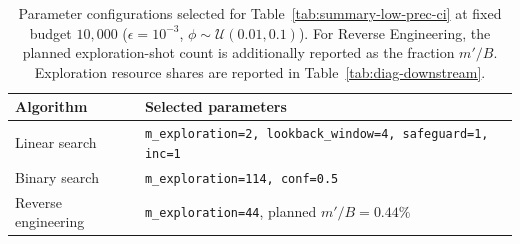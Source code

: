 \begin{table}[ht]
\centering
\caption{Parameter configurations selected for Table~\ref{tab:summary-low-prec-ci} at fixed budget $10{,}000$ ($\epsilon=10^{-3}$, $\phi\sim\mathcal{U}(0.01,0.1)$). For Reverse Engineering, the planned exploration-shot count is additionally reported as the fraction $m'/B$. Exploration resource shares are reported in Table~\ref{tab:diag-downstream}.}
\label{tab:opt-param-first-tab}
\begin{tabular}{ll}
\toprule
Algorithm
& Selected parameters \\
\midrule
Linear search
& \texttt{m\_exploration=2, lookback\_window=4, safeguard=1, inc=1} \\
Binary search
& \texttt{m\_exploration=114, conf=0.5} \\
Reverse engineering
& \texttt{m\_exploration=44}, planned $m'/B=0.44\%$ \\
\bottomrule
\end{tabular}
\end{table}
